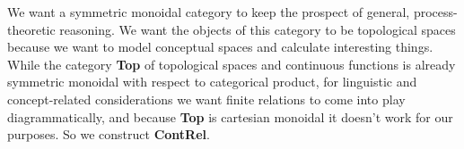  We want a symmetric monoidal category to keep the prospect of general, process-theoretic reasoning. We want the objects of this category to be topological spaces because we want to model conceptual spaces and calculate interesting things. While the category \textbf{Top} of topological spaces and continuous functions is already symmetric monoidal with respect to categorical product, for linguistic and concept-related considerations we want finite relations to come into play diagrammatically, and because \textbf{Top} is cartesian monoidal it doesn't work for our purposes. So we construct \textbf{ContRel}.
